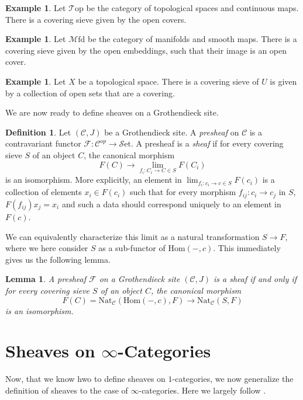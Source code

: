 \documentclass[10pt]{amsart}
\newcommand{\C}{\mathscr{C}}
\newcommand{\F}{\mathscr{F}}
\newcommand{\Hom}{\mathrm{Hom}}
\newcommand{\set}{\mathscr{S}\mathrm{et}}
\newcommand{\Nat}{\mathrm{Nat}}
\newcommand{\Top}{\mathscr{T}\mathrm{op}}
\newcommand{\Mfd}{\mathscr{M}\mathrm{fd}}
\newtheorem{lemma}[equation]{Lemma}
\theoremstyle{definition}
\newtheorem{definition}[equation]{Definition}
\newtheorem{example}[equation]{Example}
\theoremstyle{remark}
\begin{document}
\begin{example}
  Let $\Top$ be the category of topological spaces and continuous maps. There is a covering sieve given by the open covers.
\end{example}

\begin{example}
  Let $\Mfd$ be the category of manifolds and smooth maps. There is a covering sieve given by the open embeddings, such that their image is an open cover.
\end{example}

\begin{example}
  Let $X$ be a topological space. There is a covering sieve of $U$ is given by a collection of open sets that are a covering. 
\end{example}

We are now ready to define sheaves on a Grothendieck site.

\begin{definition}
  Let $(\C, J)$ be a Grothendieck site. A \emph{presheaf} on $\C$ is a contravariant functor $\F : \C^{op} \to \set$. A presheaf is a \emph{sheaf} if for every covering sieve $S$ of an object $C$, the canonical morphism
  \[ F(C) \to \lim_{f_i\colon C_i \to C \in S} F(C_i) \]
  is an isomorphism. More explicitly, an element in $\lim_{f_i\colon c_i \to c \in S} F(c_i)$ is a collection of elements $x_i \in F(c_i)$ such that for every morphism $f_{ij}\colon c_i \to c_j$ in $S$, $F(f_{ij})x_j = x_i$ and such a data should correspond  uniquely to an element in $F(c)$. 
\end{definition}

We can equivalently characterize this limit as a natural transformation $S \to F$, where we here consider $S$ as a sub-functor of $\Hom(-,c)$. This immediately gives us the following lemma.

\begin{lemma}
  A presheaf $\F$ on a Grothendieck site $(\C, J)$ is a sheaf if and only if for every covering sieve $S$ of an object $C$, the canonical morphism
  \[ F(C)  = \Nat_\C(\Hom(-,c),F)\to \Nat_\C(S,F) \]
  is an isomorphism. 
\end{lemma}

\section{Sheaves on \texorpdfstring{$\infty$}{oo}-Categories}
Now, that we know hwo  to define sheaves on $1$-categories, we now generalize the definition of sheaves to the case of $\infty$-categories. Here we largely follow \cite{lurie2009htt}.
\end{document}
